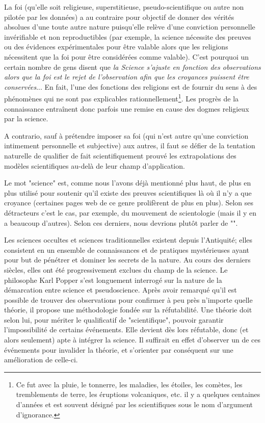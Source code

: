 	La foi (qu'elle soit religieuse, superstitieuse, pseudo-scientifique ou autre non pilotée par les données) a au contraire pour objectif de donner des vérités absolues d'une toute autre nature puisqu'elle relève d'une conviction personnelle invérifiable et non reproductibles (par exemple, la science nécessite des preuves ou des évidences expérimentales pour être valable alors que les religions nécessitent que la foi pour être considérées comme valable). C'est pourquoi un certain nombre de gens disent que \textit{la Science s'ajuste en fonction des observations alors que la foi est le rejet de l'observation afin que les croyances puissent être conservées}... En fait, l'une des fonctions des religions est de fournir du sens à des phénomènes qui ne sont pas explicables rationnellement\footnote{Ce fut avec la pluie, le tonnerre, les maladies, les étoiles, les comètes, les tremblements de terre, les éruptions volcaniques, etc. il y a quelques centaines d'années et est souvent désigné par les scientifiques sous le nom d'argument d'ignorance. }. Les progrès de la connaissance entraînent donc parfois une remise en cause des dogmes religieux par la science. 

	A contrario, sauf à prétendre imposer sa foi (qui n'est autre qu'une conviction intimement personnelle et subjective) aux autres, il faut se défier de la tentation naturelle de qualifier de fait scientifiquement prouvé les extrapolations des modèles scientifiques au-delà de leur champ d'application.
	
	Le mot "science" est, comme nous l'avons déjà mentionné plus haut, de plus en plus utilisé pour soutenir qu'il existe des preuves scientifiques là où il n'y a que croyance (certaines pages web de ce genre prolifèrent de plus en plus). Selon ses détracteurs c'est le cas, par exemple, du mouvement de scientologie (mais il y en a beaucoup d'autres). Selon ces derniers, nous devrions plutôt parler de "".

	Les sciences occultes et sciences traditionnelles existent depuis l'Antiquité; elles consistent en un ensemble de connaissances et de pratiques mystérieuses ayant pour but de pénétrer et dominer les secrets de la nature. Au cours des derniers siècles, elles ont été progressivement exclues du champ de la science. Le philosophe Karl Popper s'est longuement interrogé sur la nature de la démarcation entre science et pseudoscience. Après avoir remarqué qu'il est possible de trouver des observations pour confirmer à peu près n'importe quelle théorie, il propose une méthodologie fondée sur la réfutabilité. Une théorie doit selon lui, pour mériter le qualificatif de "scientifique", pouvoir garantir l'impossibilité de certains événements. Elle devient dès lors réfutable, donc (et alors seulement) apte à intégrer la science. Il suffirait en effet d'observer un de ces événements pour invalider la théorie, et s'orienter par conséquent sur une amélioration de celle-ci.
	
